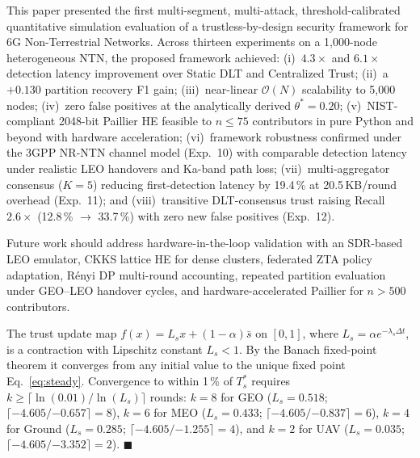 \documentclass[journal,twoside,10pt]{IEEEtran}
\newcommand{\QED}{\hfill$\blacksquare$}
\begin{document}
This paper presented the first multi-segment, multi-attack,
threshold-calibrated quantitative simulation evaluation of a
trustless-by-design security framework for 6G Non-Terrestrial Networks.
Across thirteen experiments on a 1{,}000-node heterogeneous NTN,
the proposed framework achieved:
(i)~$4.3\times$ and $6.1\times$ detection latency improvement over
Static DLT and Centralized Trust;
(ii)~a $+0.130$ partition recovery F1 gain;
(iii)~near-linear $\mathcal{O}(N)$ scalability to 5{,}000 nodes;
(iv)~zero false positives at the analytically derived
$\theta^*\!=\!0.20$;
(v)~NIST-compliant 2048-bit Paillier HE feasible to $n\!\leq\!75$
contributors in pure Python and beyond with hardware acceleration;
(vi)~framework robustness confirmed under the 3GPP NR-NTN channel model
(Exp.~10) with comparable detection latency under realistic LEO
handovers and Ka-band path loss;
(vii)~multi-aggregator consensus ($K\!=\!5$) reducing first-detection
latency by 19.4\,\% at 20.5\,KB/round overhead (Exp.~11); and
(viii)~transitive DLT-consensus trust raising Recall $2.6\times$
(12.8\,\% $\rightarrow$ 33.7\,\%) with zero new false positives (Exp.~12).

Future work should address hardware-in-the-loop validation with an
SDR-based LEO emulator, CKKS lattice HE for dense clusters, federated
ZTA policy adaptation, R\'{e}nyi DP multi-round accounting,
repeated partition evaluation under GEO--LEO handover cycles,
and hardware-accelerated Paillier for $n\!>\!500$ contributors.

\label{app:convergence}

The trust update map $f(x) = L_s x + (1\!-\!\alpha)\bar{s}$
on $[0,1]$, where $L_s = \alpha e^{-\lambda_s \Delta t}$,
is a contraction with Lipschitz constant $L_s < 1$.
By the Banach fixed-point theorem it converges from any initial value
to the unique fixed point Eq.~\eqref{eq:steady}.
Convergence to within 1\,\% of $T^*_s$ requires
$k \geq \lceil\ln(0.01)/\ln(L_s)\rceil$ rounds:
$k\!=\!8$ for GEO ($L_s\!=\!0.518$;
$\lceil{-4.605}/{-0.657}\rceil\!=\!8$),
$k\!=\!6$ for MEO ($L_s\!=\!0.433$;
$\lceil{-4.605}/{-0.837}\rceil\!=\!6$),
$k\!=\!4$ for Ground ($L_s\!=\!0.285$;
$\lceil{-4.605}/{-1.255}\rceil\!=\!4$), and
$k\!=\!2$ for UAV ($L_s\!=\!0.035$;
$\lceil{-4.605}/{-3.352}\rceil\!=\!2$).
\QED
\end{document}
